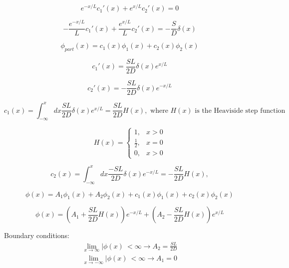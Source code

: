 \documentclass[12pt]{article}
\begin{document}
\begin{equation*}
e^{-x/L}c_1'(x) + e^{x/L}c_2'(x) = 0
\end{equation*}

\begin{equation*}
-\frac{e^{-x/L}}{L}c_1'(x) + \frac{e^{x/L}}{L}c_2'(x) = -\frac{S}{D}\delta(x)
\end{equation*}

\begin{equation*}
\phi_{part}(x) = c_1(x)\phi_1(x) + c_2(x)\phi_2(x)
\end{equation*}

\begin{equation*}
c_1'(x) = \frac{SL}{2D}\delta(x)e^{x/L}
\end{equation*}

\begin{equation*}
c_2'(x) = -\frac{SL}{2D}\delta(x)e^{-x/L}
\end{equation*}

\begin{equation*}
c_1(x) = \int_{-\infty}^x dx\frac{SL}{2D}\delta(x)e^{x/L} = \frac{SL}{2D}H(x),
\text{ where $H(x)$ is the Heaviside step function}
\end{equation*}

\begin{equation*}
  H(x)=\begin{cases}
    1, & x > 0 \\
    \tfrac{1}{2}, & x = 0 \\
    0, & x > 0
  \end{cases}
\end{equation*}

\begin{equation*}
c_2(x) = \int_{-\infty}^x dx\frac{-SL}{2D}\delta(x)e^{-x/L} = -\frac{SL}{2D}H(x),
\end{equation*}

\begin{equation*}
\phi(x) = A_1\phi_1(x) + A_2\phi_2(x) + c_1(x)\phi_1(x) + c_2(x)\phi_2(x)
\end{equation*}

\begin{equation*}
\phi(x) = \left(A_1 + \frac{SL}{2D}H(x)\right)e^{-x/L} + \left(A_2 - \frac{SL}{2D}H(x)\right)e^{x/L}
\end{equation*}

Boundary conditions:
\vspace{-5 mm}
\begin{gather*}
\lim\limits_{x\to\infty}|\phi(x)\ < \infty \rightarrow A_2 = \frac{SL}{2D} \\
\lim\limits_{x\to-\infty}|\phi(x)\ < \infty \rightarrow A_1 = 0
\end{gather*}
\end{document}
